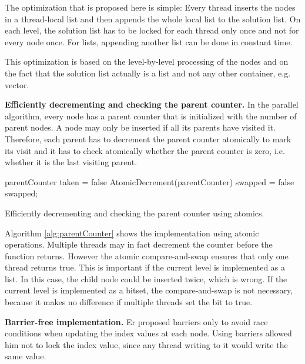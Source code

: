 \documentclass[letterpaper]{article}
\newcommand{\mypar}[1]{{\bf #1.}}
\begin{document}
The optimization that is proposed here is simple: Every thread inserts the nodes in a thread-local list and then appends the whole local list to the solution list.
On each level, the solution list has to be locked for each thread only once and not for every node once. For lists, appending another list can be done in constant time.

This optimization is based on the level-by-level processing of the nodes and on the fact that the solution list actually is a list and not any other container, e.g. vector.

\mypar{Efficiently decrementing and checking the parent counter}
In the parallel algorithm, every node has a parent counter that is initialized with the number of parent nodes.
A node may only be inserted if all its parents have visited it.
Therefore, each parent has to decrement the parent counter atomically to mark its visit and it has to check atomically whether the parent counter is zero, i.e. whether it is the last visiting parent.

\begin{algorithm}
  \KwInt parentCounter\;
  \KwBool taken = false\;
   {
    AtomicDecrement(parentCounter)\;
    \KwBool swapped = false\;
    \KwRet swapped;
  }
 \caption{Efficiently decrementing and checking the parent counter using atomics.}
 \label{alg:parentCounter}
\end{algorithm}

Algorithm \ref{alg:parentCounter} shows the implementation using atomic operations. Multiple threads may in fact decrement the counter before the function returns.
However the atomic compare-and-swap ensures that only one thread returns true. This is important if the current level is implemented as a list.
In this case, the child node could be inserted twice, which is wrong.
If the current level is implemented as a bitset, the compare-and-swap is not necessary, because it makes no difference if multiple threads set the bit to true.

\mypar{Barrier-free implementation}
Er \cite{er1983parallel} proposed barriers only to avoid race conditions when updating the index values at each node.
Using barriers allowed him not to lock the index value, since any thread writing to it would write the same value.
\end{document}
